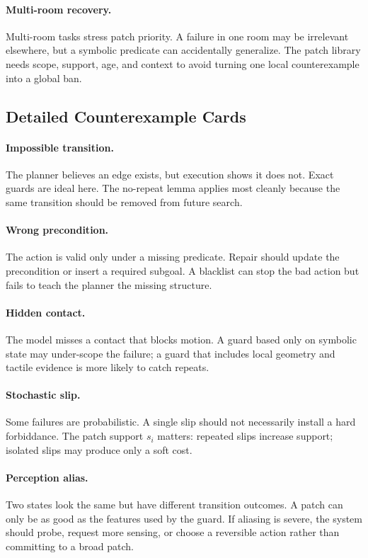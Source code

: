 \documentclass{article}
\begin{document}
\paragraph{Multi-room recovery.}
Multi-room tasks stress patch priority. A failure in one room may be irrelevant
elsewhere, but a symbolic predicate can accidentally generalize. The patch
library needs scope, support, age, and context to avoid turning one local
counterexample into a global ban.

\subsection{Detailed Counterexample Cards}

\paragraph{Impossible transition.}
The planner believes an edge exists, but execution shows it does not. Exact
guards are ideal here. The no-repeat lemma applies most cleanly because the
same transition should be removed from future search.

\paragraph{Wrong precondition.}
The action is valid only under a missing predicate. Repair should update the
precondition or insert a required subgoal. A blacklist can stop the bad action
but fails to teach the planner the missing structure.

\paragraph{Hidden contact.}
The model misses a contact that blocks motion. A guard based only on symbolic
state may under-scope the failure; a guard that includes local geometry and
tactile evidence is more likely to catch repeats.

\paragraph{Stochastic slip.}
Some failures are probabilistic. A single slip should not necessarily install a
hard forbiddance. The patch support $s_i$ matters: repeated slips increase
support; isolated slips may produce only a soft cost.

\paragraph{Perception alias.}
Two states look the same but have different transition outcomes. A patch can
only be as good as the features used by the guard. If aliasing is severe, the
system should probe, request more sensing, or choose a reversible action rather
than committing to a broad patch.
\end{document}
